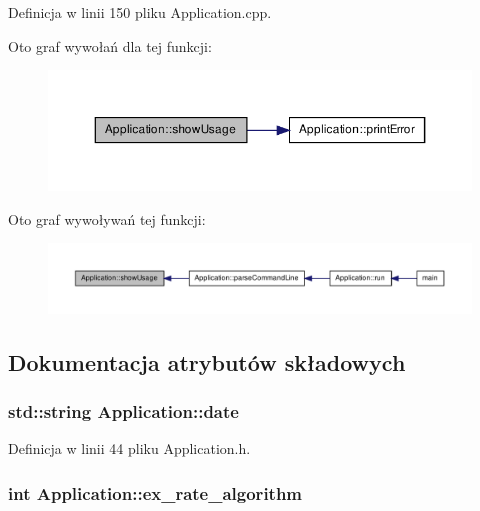 \-Definicja w linii 150 pliku \-Application.\-cpp.



\-Oto graf wywołań dla tej funkcji\-:\nopagebreak
\begin{figure}[H]
\begin{center}
\leavevmode
\includegraphics[width=350pt]{class_application_a347b2679d939278e31d7c6bafcd1f4c1_cgraph}
\end{center}
\end{figure}




\-Oto graf wywoływań tej funkcji\-:\nopagebreak
\begin{figure}[H]
\begin{center}
\leavevmode
\includegraphics[width=350pt]{class_application_a347b2679d939278e31d7c6bafcd1f4c1_icgraph}
\end{center}
\end{figure}




\subsection{\-Dokumentacja atrybutów składowych}
\hypertarget{class_application_a4e66f842b9681694c2c3a7ab402a3373}{
\subsubsection[{date}]{\setlength{\rightskip}{0pt plus 5cm}std\-::string {\bf \-Application\-::date}}}\label{class_application_a4e66f842b9681694c2c3a7ab402a3373}


\-Definicja w linii 44 pliku \-Application.\-h.

\hypertarget{class_application_ad351bc6efdb11d1086bf82803f1c3e92}{
\subsubsection[{ex\-\_\-rate\-\_\-algorithm}]{\setlength{\rightskip}{0pt plus 5cm}int {\bf \-Application\-::ex\-\_\-rate\-\_\-algorithm}}}\label{class_application_ad351bc6efdb11d1086bf82803f1c3e92}


